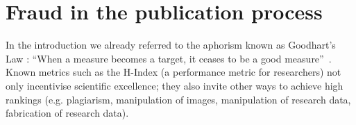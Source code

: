 \documentclass{ou-report}
\newcommand{\outline}[1]{{\color{blue} #1}}
\begin{document}

\section{Fraud in the publication process}
\label{sec:domain_analysis:fraud}
In the introduction we already referred to the aphorism known as Goodhart’s Law 
: ``When a measure becomes a 
target, it ceases to be a good measure''~\cite{strathern_1997}. Known metrics 
such as the H-Index (a performance metric for researchers) not only incentivise 
scientific excellence; they also invite other ways to achieve high rankings 
(e.g. plagiarism, manipulation of images, manipulation of research data, 
fabrication of research data). 





\end{document}
